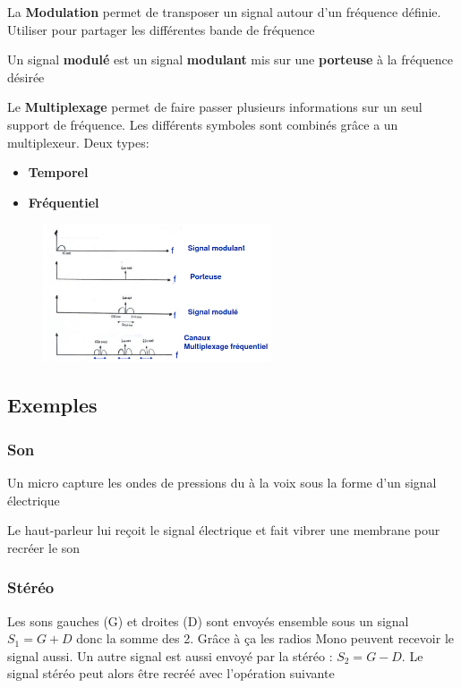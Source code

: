 		La \textbf{Modulation} permet de transposer un signal autour d'un fréquence définie. Utiliser pour partager les différentes bande de fréquence
		
		Un signal \textbf{modulé} est un signal \textbf{modulant} mis sur une \textbf{porteuse} à la fréquence désirée
		
		Le \textbf{Multiplexage} permet de faire passer plusieurs informations sur un seul support de fréquence. Les différents symboles sont combinés grâce a un multiplexeur. Deux types:
		\begin{itemize}
			\item \textbf{Temporel}
			\item \textbf{Fréquentiel}
		\end{itemize}
		\begin{figure}[H]
			\centering
			\includegraphics[width=0.6\textwidth]{img/Multiplexage.png}
		\end{figure}
	\subsection{Exemples}
		\subsubsection{Son}
			Un micro capture les ondes de pressions du à la voix sous la forme d'un signal électrique
			
			Le haut-parleur lui reçoit le signal électrique et fait vibrer une membrane pour recréer le son
			
			
		\subsubsection{Stéréo}
		
			Les sons gauches (G) et droites (D) sont envoyés ensemble sous un signal $S_1 = G+D$ donc la somme des 2. Grâce à ça les radios Mono peuvent recevoir le signal aussi. Un autre signal est aussi envoyé par la stéréo : $S_2 = G-D$. Le signal stéréo peut alors être recréé avec l'opération suivante


